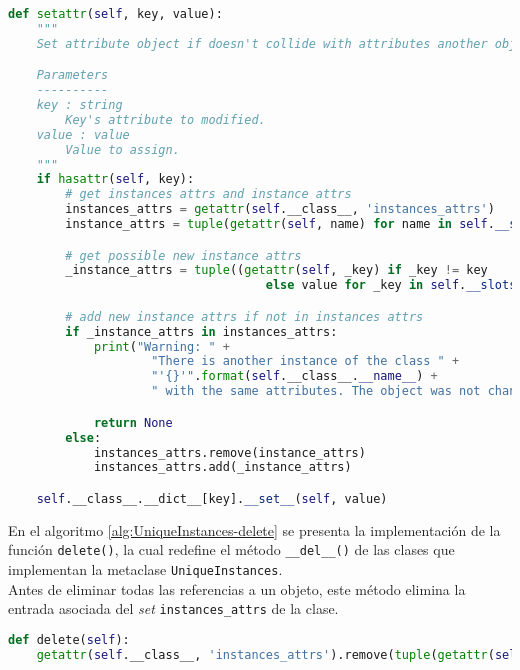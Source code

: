 \begin{lstlisting}[language=Python,caption=Función \texttt{setattr} implementada en la clase \texttt{UniqueInstances}.,label=alg:UniqueInstances-setattr, frame=single]
def setattr(self, key, value):
    """
    Set attribute object if doesn't collide with attributes another object

    Parameters
    ----------
    key : string
        Key's attribute to modified.
    value : value
        Value to assign.
    """
    if hasattr(self, key):
        # get instances attrs and instance attrs
        instances_attrs = getattr(self.__class__, 'instances_attrs')
        instance_attrs = tuple(getattr(self, name) for name in self.__slots__)

        # get possible new instance attrs
        _instance_attrs = tuple((getattr(self, _key) if _key != key
                                    else value for _key in self.__slots__))

        # add new instance attrs if not in instances attrs
        if _instance_attrs in instances_attrs:
            print("Warning: " +
                    "There is another instance of the class " +
                    "'{}'".format(self.__class__.__name__) +
                    " with the same attributes. The object was not changed.")

            return None
        else:
            instances_attrs.remove(instance_attrs)
            instances_attrs.add(_instance_attrs)

    self.__class__.__dict__[key].__set__(self, value)
\end{lstlisting}
\bigskip

En el algoritmo \ref{alg:UniqueInstances-delete} se presenta la implementación de la función \verb|delete()|, la cual redefine el método \verb|__del__()| de las clases que implementan la metaclase \verb|UniqueInstances|.\\

Antes de eliminar todas las referencias a un objeto, este método elimina la entrada asociada del \emph{set} \verb|instances_attrs| de la clase.\\

\begin{lstlisting}[language=Python,caption=Function \texttt{delete} implementada en la clase \texttt{UniqueInstances}.,label=alg:UniqueInstances-delete, frame=single]
def delete(self):
    getattr(self.__class__, 'instances_attrs').remove(tuple(getattr(self, name) for name in self.__slots__))
\end{lstlisting}
\bigskip

